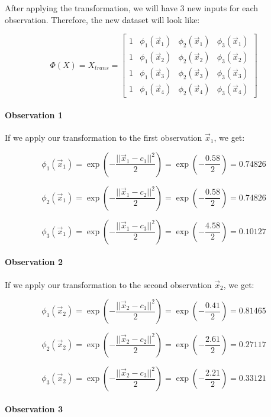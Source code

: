 \documentclass{article}
\begin{document}
After applying the transformation, we will have 3 new inputs for each observation. Therefore, the new dataset will look like:

\[ \Phi(X) =  X_{trans} = \begin{bmatrix} 1 & \phi_1(\vec{x}_1) & \phi_2(\vec{x}_1) & \phi_3(\vec{x}_1) \\ 1 & \phi_1(\vec{x}_2) & \phi_2(\vec{x}_2) & \phi_3(\vec{x}_2) \\ 1 & \phi_1(\vec{x}_3) & \phi_2(\vec{x}_3) & \phi_3(\vec{x}_3) \\ 1 & \phi_1(\vec{x}_4) & \phi_2(\vec{x}_4) & \phi_3(\vec{x}_4) \end{bmatrix} \]

\paragraph{Observation 1}

If we apply our transformation to the first observation $\vec{x}_1$, we get:

\[ \phi_1(\vec{x}_1) = \exp \left( - \frac{||\vec{x}_1 - c_1||^2}{2} \right) = \exp \left( - \frac{0.58}{2} \right) = 0.74826 \]

\[ \phi_2(\vec{x}_1) = \exp \left( - \frac{||\vec{x}_1 - c_2||^2}{2} \right) = \exp \left( - \frac{0.58}{2} \right) = 0.74826 \]

\[ \phi_3(\vec{x}_1) = \exp \left( - \frac{||\vec{x}_1 - c_3||^2}{2} \right) = \exp \left( - \frac{4.58}{2} \right) = 0.10127 \]

\paragraph{Observation 2}

If we apply our transformation to the second observation $\vec{x}_2$, we get:

\[ \phi_1(\vec{x}_2) = \exp \left( - \frac{||\vec{x}_2 - c_1||^2}{2} \right) = \exp \left( - \frac{0.41}{2} \right) = 0.81465 \]

\[ \phi_2(\vec{x}_2) = \exp \left( - \frac{||\vec{x}_2 - c_2||^2}{2} \right) = \exp \left( - \frac{2.61}{2} \right) = 0.27117 \]

\[ \phi_3(\vec{x}_2) = \exp \left( - \frac{||\vec{x}_2 - c_3||^2}{2} \right) = \exp \left( - \frac{2.21}{2} \right) = 0.33121 \]

\paragraph{Observation 3}
\end{document}
